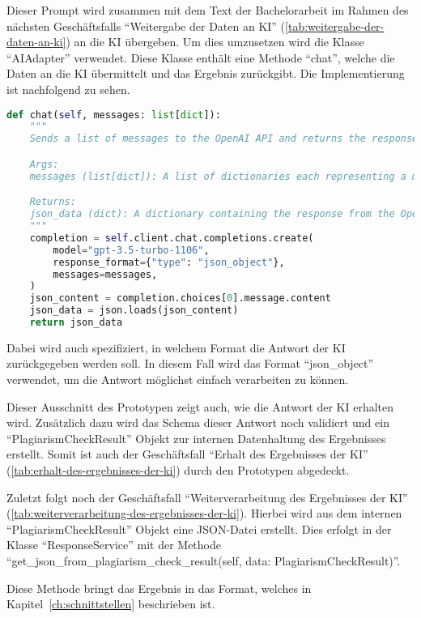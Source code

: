 Dieser Prompt wird zusammen mit dem Text der Bachelorarbeit im Rahmen des nächsten Geschäftsfalls
``Weitergabe der Daten an KI'' (\ref{tab:weitergabe-der-daten-an-ki}) an die KI übergeben.
Um dies umzusetzen wird die Klasse ``AIAdapter'' verwendet.
Diese Klasse enthält eine Methode ``chat'', welche die Daten an die KI übermittelt und das Ergebnis zurückgibt.
Die Implementierung ist nachfolgend zu sehen.
\begin{lstlisting}[caption={Weitergabe der Daten an KI},captionpos=b,label={lst:weitergabe-an-ki}, language=Python]
def chat(self, messages: list[dict]):
    """
    Sends a list of messages to the OpenAI API and returns the response.

    Args:
    messages (list[dict]): A list of dictionaries each representing a message.

    Returns:
    json_data (dict): A dictionary containing the response from the OpenAI API.
    """
    completion = self.client.chat.completions.create(
        model="gpt-3.5-turbo-1106",
        response_format={"type": "json_object"},
        messages=messages,
    )
    json_content = completion.choices[0].message.content
    json_data = json.loads(json_content)
    return json_data
\end{lstlisting}

Dabei wird auch spezifiziert, in welchem Format die Antwort der KI zurückgegeben werden soll.
In diesem Fall wird das Format ``json\_object'' verwendet, um die Antwort möglichst einfach verarbeiten zu können.

Dieser Ausschnitt des Prototypen zeigt auch, wie die Antwort der KI erhalten wird.
Zusätzlich dazu wird das Schema dieser Antwort noch validiert und ein ``PlagiarismCheckResult''
Objekt zur internen Datenhaltung des Ergebnisses erstellt.
Somit ist auch der Geschäftsfall ``Erhalt des Ergebnisses der KI'' (\ref{tab:erhalt-des-ergebnisses-der-ki}) durch den Prototypen abgedeckt.

Zuletzt folgt noch der Geschäftsfall ``Weiterverarbeitung des Ergebnisses der KI'' (\ref{tab:weiterverarbeitung-des-ergebnisses-der-ki}).
Hierbei wird aus dem internen ``PlagiarismCheckResult'' Objekt eine JSON-Datei erstellt.
Dies erfolgt in der Klasse ``ResponseService'' mit der Methode ``get\_json\_from\_plagiarism\_check\_result(self, data: PlagiarismCheckResult)''.

Diese Methode bringt das Ergebnis in das Format, welches in Kapitel~\ref{ch:schnittstellen} beschrieben ist.

